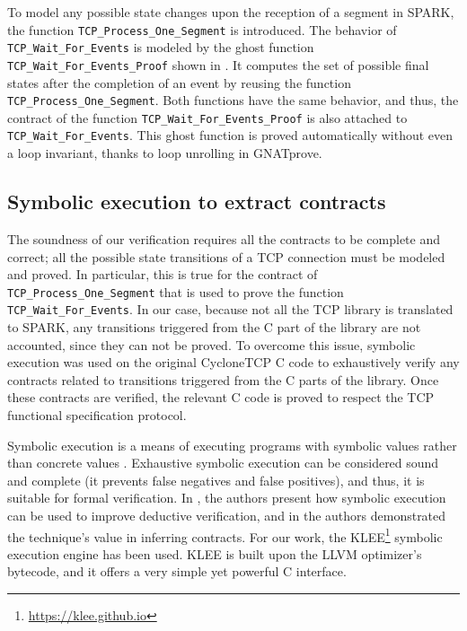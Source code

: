 \documentclass[conference]{IEEEtran}
\def\spark#1{\lstinline[language=Ada]{#1}}
\begin{document}
To model any possible state changes upon the reception of a segment in SPARK, the function \spark{TCP_Process_One_Segment} is introduced.
The behavior of \spark{TCP_Wait_For_Events} is modeled by the ghost function \spark{TCP_Wait_For_Events_Proof} shown in . It computes the set of possible final states after the completion of an event by reusing the function \spark{TCP_Process_One_Segment}. Both functions have the same behavior, and thus, the contract of the function \spark{TCP_Wait_For_Events_Proof} is also attached to \spark{TCP_Wait_For_Events}. This ghost function is proved automatically without even a loop invariant, thanks to loop unrolling in GNATprove.


\subsection{Symbolic execution to extract contracts}

The soundness of our verification requires all the contracts to be complete and correct; all the possible state transitions of a TCP connection must be modeled and proved.  In particular, this is true for the contract of \spark{TCP_Process_One_Segment} that is used to prove the function \spark{TCP_Wait_For_Events}. In our case, because not all the TCP library is translated to SPARK, any transitions triggered from the C part of the library are not accounted, since they can not be proved. To overcome this issue, symbolic execution was used on the original CycloneTCP C code to exhaustively verify any contracts related to transitions triggered from the C parts of the library. Once these contracts are verified, the relevant C code is proved to respect the TCP functional specification protocol. 

Symbolic execution is a means of executing programs with symbolic values rather than concrete values \cite{symbolic_exec_survey:2018}. Exhaustive symbolic execution can be considered sound and complete (it prevents false negatives and false positives), and thus, it is suitable for formal verification. In \cite{vanoverberghe2008using}, the authors present how symbolic execution can be used to improve deductive verification, and in \cite{kassios2012comparing} the authors demonstrated the technique's value in inferring contracts. For our work,  the KLEE\footnote{\url{https://klee.github.io}} symbolic execution engine has been used. KLEE is built upon the LLVM optimizer's bytecode, and it offers a very simple yet powerful C interface.
\end{document}

